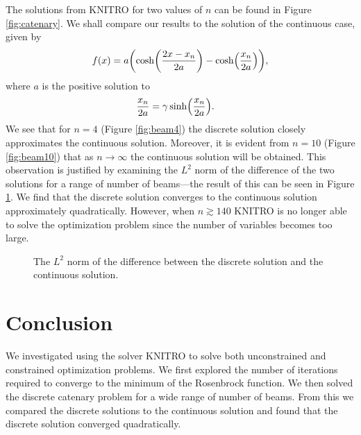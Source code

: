 \documentclass[11pt,a4paper]{article}
\let\originalleft\left
\let\originalright\right
\renewcommand{\left}{\mathopen{}\mathclose\bgroup\originalleft}
\renewcommand{\right}{\aftergroup\egroup\originalright}
\begin{document}
The solutions from KNITRO for two values of $n$ can be found in Figure \ref{fig:catenary}. We shall compare our results to the solution of the continuous case, given by
\begin{align}
	f(x) = a \left( \cosh \left( \frac{2x - x_n}{2a} \right) - \cosh \left( \frac{x_n}{2a} \right) \right),
\end{align}
where $a$ is the positive solution to
\begin{align}
	\frac{x_n}{2a} &= \gamma \sinh \left( \frac{x_n}{2a} \right).
\end{align}
We see that for $n = 4$ (Figure \ref{fig:beam4}) the discrete solution closely approximates the continuous solution. Moreover, it is evident from $n = 10$ (Figure \ref{fig:beam10}) that as $n \rightarrow \infty$ the continuous solution will be obtained. This observation is justified by examining the $L^2$ norm of the difference of the two solutions for a range of number of beams---the result of this can be seen in Figure \ref{fig:convergence}. We find that the discrete solution converges to the continuous solution approximately quadratically. However, when $n \gtrsim 140$ KNITRO is no longer able to solve the optimization problem since the number of variables becomes too large.

\begin{figure}[tbp]
	\centering
	
	\caption{The $L^2$ norm of the difference between the discrete solution and the continuous solution.}
	\label{fig:convergence}
\end{figure}

\section{Conclusion}
We investigated using the solver KNITRO to solve both unconstrained and constrained optimization problems. We first explored the number of iterations required to converge to the minimum of the Rosenbrock function. We then solved the discrete catenary problem for a wide range of number of beams. From this we compared the discrete solutions to the continuous solution and found that the discrete solution converged quadratically.


\end{document}
